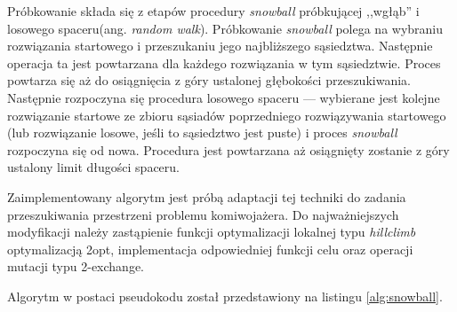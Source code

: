 Próbkowanie składa się z etapów procedury \textit{snowball} próbkującej ,,wgłąb'' i losowego spaceru(ang. \textit{random walk}).
Próbkowanie \textit{snowball} polega na wybraniu rozwiązania startowego i przeszukaniu jego najbliższego sąsiedztwa.
Następnie operacja ta jest powtarzana dla każdego rozwiązania w tym sąsiedztwie. Proces powtarza się aż do osiągnięcia z góry ustalonej głębokości
przeszukiwania. Następnie rozpoczyna się procedura losowego spaceru --- wybierane jest kolejne rozwiązanie startowe
ze zbioru sąsiadów poprzedniego rozwiązywania startowego (lub rozwiązanie losowe, jeśli to sąsiedztwo jest puste) i proces \textit{snowball}
rozpoczyna się od nowa. Procedura jest powtarzana aż osiągnięty zostanie z góry ustalony limit długości spaceru.

Zaimplementowany algorytm jest próbą adaptacji tej techniki do zadania przeszukiwania przestrzeni
problemu komiwojażera. Do najważniejszych modyfikacji należy zastąpienie funkcji optymalizacji lokalnej typu \textit{hillclimb}
optymalizacją 2opt, implementacja odpowiedniej funkcji celu oraz operacji mutacji typu 2-exchange.

Algorytm w postaci pseudokodu został przedstawiony na listingu \ref{alg:snowball}.

\vspace{1em}


